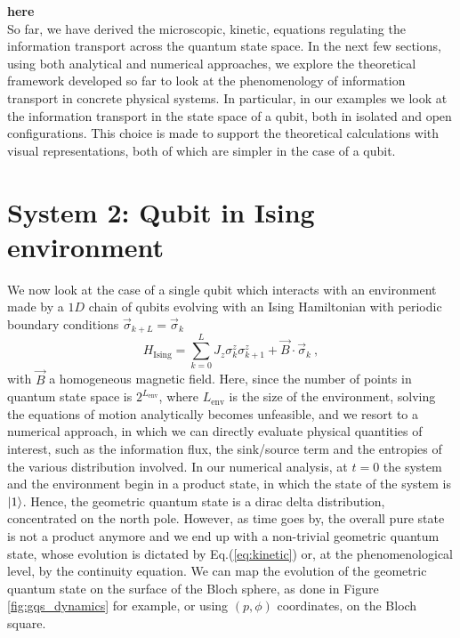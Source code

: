 \documentclass[%
 reprint,
 superscriptaddress,
 aps,
 pra,
]{revtex4-2}
\theoremstyle{definition}
\begin{document}
{\bf here}\\

So far, we have derived the microscopic, kinetic, equations regulating the 
information transport across the quantum state space. In the next few sections, using
both analytical and numerical approaches, we explore the theoretical framework developed
so far to look at the phenomenology of information transport in concrete physical systems. 
In particular, in our examples we look at the information transport in the state 
space of a qubit, both in isolated and open configurations. This choice is made 
to support the theoretical calculations with visual representations, both of which 
are simpler in the case of a qubit.


\section{System 2: Qubit in Ising environment}
\label{sec:EXAMPLES2}

We now look at the case of a single qubit which interacts with an environment 
made by a $1D$ chain of qubits evolving with an Ising Hamiltonian with periodic
boundary conditions $\vec{\sigma}_{k+L}= \vec{\sigma}_k$
\begin{equation}
H_{\mathrm{Ising}} = \sum_{k=0}^{L} J_z \sigma_k^z \sigma_{k+1}^{z} + \vec{B} \cdot \vec{\sigma}_k~,
\end{equation}
with $\vec{B}$ a homogeneous magnetic field. Here, since the number of points
in quantum state space is $2^{L_{\mathrm{env}}}$, where $L_{\mathrm{env}}$
is the size of the environment, solving the equations of motion analytically becomes
unfeasible, and we resort to a numerical approach, in which we can directly evaluate
physical quantities of interest, such as the information flux, the sink/source term and
the entropies of the various distribution involved. In our numerical analysis, at $t=0$
the system and the environment begin in a product state, in which the state of the system
is $\ket{1}$. Hence, the geometric quantum state is a dirac delta distribution, concentrated 
on the north pole. However, as time goes by, the overall pure state is not a product anymore
and we end up with a non-trivial geometric quantum state, whose evolution
is dictated by Eq.(\ref{eq:kinetic}) or, at the phenomenological level, by the continuity equation. 
We can map the evolution of the geometric quantum state on the surface of the Bloch sphere, 
as done in Figure \ref{fig:gqs_dynamics} for example, or using $(p,\phi)$ coordinates, on the 
Bloch square. 
\end{document}
